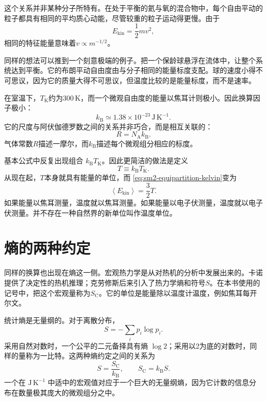 这个关系并非某种分子所特有。在处于平衡的氦与氧的混合物中，每个自由平动的粒子都具有相同的平均质心动能，尽管较重的粒子运动得更慢。由于
\begin{equation}
 E_{\mathrm{kin}}=\frac{1}{2}mv^2,
\end{equation}
相同的特征能量意味着\(v\propto m^{-1/2}\)。

同样的想法可以推到一个刻意极端的例子。把一个保龄球悬浮在流体中，让整个系统达到平衡。它的布朗平动自由度由与分子相同的能量标度支配。球的速度小得不可思议，因为它的质量大得不可思议，但温度比较的是能量标度，而不是速率。

在室温下，\(T_{\mathrm K}\)约为\(300\,\mathrm K\)，而一个微观自由度的能量以焦耳计则极小。因此换算因子极小：
\begin{equation}
 k_{\mathrm B}\simeq 1.38\times10^{-23}\,
 \mathrm{J\,K^{-1}}.
 \label{eq:sm2-boltzmann-value}
\end{equation}
它的尺度与阿伏伽德罗数之间的关系并非巧合，而是相互关联的：
\begin{equation}
 R=N_{\mathrm A}k_{\mathrm B}.
\end{equation}
气体常数\(R\)描述一摩尔，而\(k_{\mathrm B}\)描述每个微观组分相应的标度。

基本公式中反复出现组合
\(k_{\mathrm B}T_{\mathrm K}\)。因此更简洁的做法是定义
\begin{equation}
 T\equiv k_{\mathrm B}T_{\mathrm K}.
 \label{eq:sm2-energy-temperature}
\end{equation}
从现在起，\(T\)本身就具有能量的单位，而
\eqref{eq:sm2-equipartition-kelvin}变为
\begin{equation}
 \left\langle E_{\mathrm{kin}}\right\rangle=\frac{3}{2}T.
 \label{eq:sm2-equipartition-natural}
\end{equation}
如果能量以焦耳测量，温度就以焦耳测量。如果能量以电子伏测量，温度就以电子伏测量。并不存在一种自然界的新单位叫作温度单位。

\section{熵的两种约定}

同样的换算也出现在熵这一侧。宏观热力学是从对热机的分析中发展出来的。卡诺提供了决定性的热机推理；克劳修斯后来引入了热力学熵和符号\(S\)。在本书使用的记号中，把这个宏观量称为\(S_{\mathrm C}\)。它的单位是能量除以温度计温度，例如焦耳每开尔文。

统计熵是无量纲的。对于离散分布，
\begin{equation}
 S=-\sum_i p_i\log p_i.
 \label{eq:sm2-statistical-entropy}
\end{equation}
采用自然对数时，一个公平的二元备择具有熵 \(\log2\)；采用以2为底的对数时，同样的量称为一比特。这两种熵约定之间的关系为
\begin{equation}
 S=\frac{S_{\mathrm C}}{k_{\mathrm B}},
 \qquad
 S_{\mathrm C}=k_{\mathrm B}S.
 \label{eq:sm2-entropy-conversion}
\end{equation}
一个在 \(\mathrm{J\,K^{-1}}\) 中适中的宏观值对应于一个巨大的无量纲熵，因为它计数的信息分布在数量极其庞大的微观组分之中。

